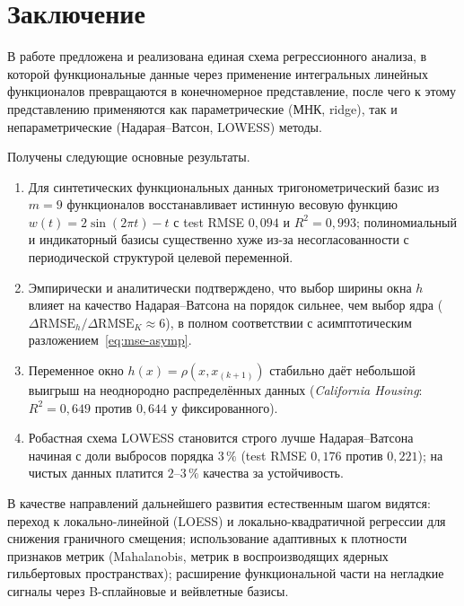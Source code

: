 \documentclass[12pt,a4paper]{article}
\theoremstyle{definition}
\theoremstyle{remark}
\begin{document}
\section{Заключение}
\label{sec:conclusion}

В работе предложена и реализована единая схема регрессионного анализа, в
которой функциональные данные через применение интегральных линейных
функционалов превращаются в конечномерное представление, после чего к
этому представлению применяются как параметрические (МНК, ridge), так и
непараметрические (Надарая--Ватсон, LOWESS) методы.

Получены следующие основные результаты.
\begin{enumerate}[leftmargin=*,itemsep=2pt,topsep=2pt]
    \item Для синтетических функциональных данных тригонометрический базис
        из $m=9$ функционалов восстанавливает истинную весовую функцию
        $w(t)=2\sin(2\pi t)-t$ с test RMSE $0{,}094$ и $R^{2}=0{,}993$;
        полиномиальный и индикаторный базисы существенно хуже из-за
        несогласованности с периодической структурой целевой переменной.
    \item Эмпирически и аналитически подтверждено, что выбор ширины окна
        $h$ влияет на качество Надарая--Ватсона на порядок сильнее, чем
        выбор ядра ($\Delta\mathrm{RMSE}_{h}/\Delta\mathrm{RMSE}_{K}\!\approx\!6$),
        в полном соответствии с асимптотическим разложением~\eqref{eq:mse-asymp}.
    \item Переменное окно $h(x)=\rho(x,x_{(k+1)})$ стабильно даёт небольшой
        выигрыш на неоднородно распределённых данных (\textit{California Housing}:
        $R^{2}\!=\!0{,}649$ против $0{,}644$ у фиксированного).
    \item Робастная схема LOWESS становится строго лучше Надарая--Ватсона
        начиная с доли выбросов порядка $3\,\%$ (test RMSE $0{,}176$ против
        $0{,}221$); на чистых данных платится $2$--$3\,\%$ качества за
        устойчивость.
\end{enumerate}

В качестве направлений дальнейшего развития естественным шагом видятся:
переход к локально-линейной (LOESS) и локально-квадратичной регрессии для
снижения граничного смещения; использование адаптивных к плотности признаков
метрик (Mahalanobis, метрик в воспроизводящих ядерных гильбертовых
пространствах); расширение функциональной части на негладкие сигналы через
B-сплайновые и вейвлетные базисы.
\end{document}
